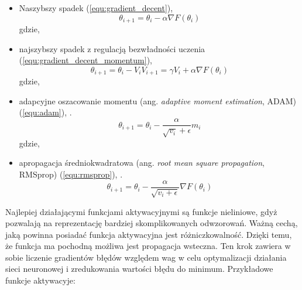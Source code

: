 {\begin{itemize}
\item Naszybszy spadek (\ref{equ:gradient_decent}),
\begin{equation}
\theta_{i+1} = \theta_i - \alpha \nabla F(\theta_i)
\label{equ:gradient_decent}
\end{equation}
gdzie,
\item najszybszy spadek z regulacją bezwładności uczenia (\ref{equ:gradient_decent_momentum}),
\begin{equation}
\theta_{i+1} = \theta_i - V_i
V_{i+1} = \gamma V_i + \alpha \nabla F(\theta_i)
\label{equ:gradient_decent_momentum}
\end{equation}
gdzie,
\item adapcyjne oszacowanie momentu (ang. \textit{adaptive moment estimation}, ADAM) (\ref{equ:adam}), \cite{Kingma2014AdamAM}.
\begin{equation}
\theta_{i+1} = \theta_i - \frac{\alpha}{\sqrt{v_i} + \epsilon} m_i
\label{equ:adam}
\end{equation}
gdzie,
\item apropagacja średniokwadratowa (ang. \textit{root mean square propagation}, RMSprop) (\ref{equ:rmsprop}), \cite{Kurbiel2017TrainingOD}.
\begin{equation}
\theta_{i+1} = \theta_i - \frac{\alpha}{\sqrt{v_i + \epsilon}} \nabla F(\theta_i)
\label{equ:rmsprop}
\end{equation}
\end{itemize}

Najlepiej działającymi funkcjami aktywacyjnymi są funkcje nieliniowe, gdyż pozwalają na reprezentację bardziej skomplikowanych odwzorowań. Ważną cechą, jaką powinna posiadać funkcja aktywacyjna jest różniczkowalność. Dzięki temu, że funkcja ma pochodną możliwa jest propagacja wsteczna. Ten krok zawiera w sobie liczenie gradientów błędów względem wag w celu optymalizacji działania sieci neuronowej i zredukowania wartości błędu do minimum. Przykładowe funkcje aktywacyje:

}
